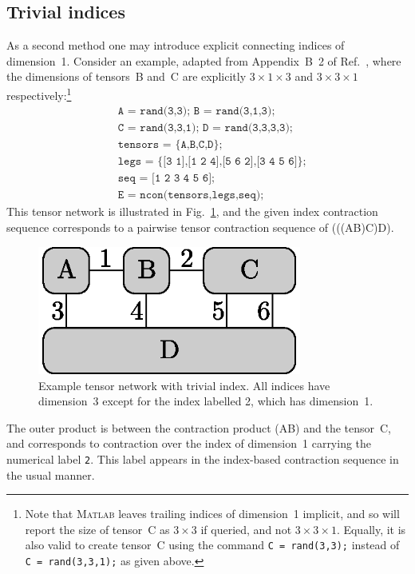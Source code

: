 \documentclass[aps,prb,reprint,superscriptaddress,amsmath,amsfonts]{revtex4-1}
\theoremstyle{definition}
\newcommand{\fref}[1]{Fig.~\ref{#1}}
\newcommand{\rcite}[1]{Ref.~\onlinecite{#1}}
\newcommand{\MATLAB}{\textsc{Matlab}}
\newcommand{\ttt}[1]{\texttt{#1}}
\newcommand{\z}{}
\begin{document}
\subsection{Trivial indices\label{sec:dim1}}

As a second method one may introduce explicit connecting indices of dimension~1. Consider an example, adapted from Appendix~B~2 of \rcite{evenbly2013}, where the dimensions of tensors~B and~C are explicitly $3\times 1\times 3$ and $3\times3\times1$ respectively:\footnote{Note that \MATLAB{} leaves trailing indices of dimension~1 implicit, and so will report the size of tensor~C as $3\times 3$ if queried, and not $3\times 3\times 1$. Equally, it is also valid to create tensor~C using the command \ttt{C~=~rand(3,3);} instead of \ttt{C~=~rand(3,3,1);} as given above.} %
\begin{align*}
&\ttt{A = rand(3,3); B = rand(3,1,3);}\\
&\ttt{C = rand(3,3,1); D = rand(3,3,3,3);}\\
&\ttt{tensors = \{A,B,C,D\};}\\
&\ttt{legs = \{[3 1],[1 2 4],[5 6 2],[3 4 5 6]\};}\\
&\ttt{seq = [1 2 3 4 5 6];}\\
&\ttt{E = ncon(tensors,legs,seq);}
\end{align*}
This tensor network is illustrated in \fref{fig:trivindexample}, 
and the given index contraction sequence corresponds to a pairwise tensor contraction sequence of (((A\z{}B)\z{}C)\z{}D). 
\begin{figure}
\includegraphics[width=246.0pt]{trivindexample}
\caption{Example tensor network with trivial index. All indices have dimension~3 except for the index labelled 2, which has dimension~1.\label{fig:trivindexample}}
\end{figure}%
The outer product %
is between %
the contraction product (A\z{}B) and the tensor~C, and corresponds to contraction over the index of dimension~1 carrying the numerical %
label \ttt{2}. This label appears in the index-based contraction sequence in the usual manner.
\end{document}

